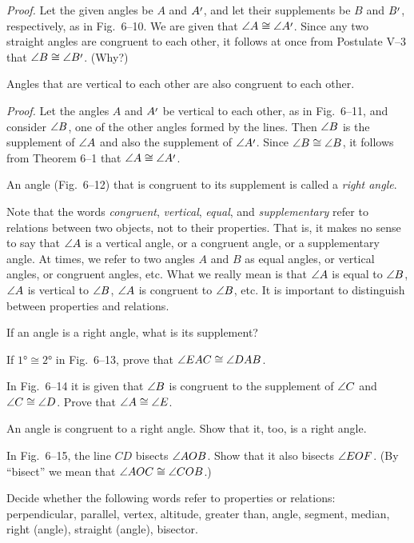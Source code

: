 \documentclass[11pt]{book}
\begin{document}
\emph{Proof.} Let the given angles be $A$ and $A\VIpr$, and let their
supplements be $B$ and $B\VIpr$, respectively, as in Fig.~6--10. We are given
that $\ang{A} \cong \ang{A\VIpr}$. Since any two straight angles are congruent
to each other, it follows at once from Postulate V--3 that $\ang{B} \cong
\ang{B\VIpr}$. (Why?)

\FIGVITENELEVENTWELVE

\begin{theorem}
Angles that are vertical to each other are also congruent to each other.
\end{theorem}

\emph{Proof.} Let the angles $A$ and $A\VIpr$ be vertical to each other, as in
Fig.~6--11, and consider $\angle B$, one of the other angles formed by the
lines. Then $\angle B$ is the supplement of $\angle A$ and also the supplement of
$\ang{A\VIpr}$. Since $\angle B \cong \angle B$, it follows from Theorem 6--1
that $\ang{A} \cong \ang{A\VIpr}$.

\begin{definition}
An angle (Fig.~6--12) that is congruent to its supplement is called a
\emph{right angle}.
\end{definition}

\begin{remark}
Note that the words \emph{congruent}, \emph{vertical}, \emph{equal}, and
\emph{supplementary} refer to relations between two objects, not to their
properties. That is, it makes no sense to say that $\angle A$ is a vertical
angle, or a congruent angle, or a supplementary angle. At times, we refer to
two angles $A$ and $B$ as equal angles, or vertical angles, or congruent
angles, etc. What we really mean is that $\angle A$ is equal to $\angle B$,
$\angle A$ is vertical to $\angle B$, $\angle A$ is congruent to $\angle B$, etc.
It is important to distinguish between properties and relations.
\end{remark}

\begin{exercisecols}
\begin{exlist}
\item If an angle is a right angle, what is its supplement?
\item If $\ang{1} \cong \ang{2}$ in Fig.~6--13, prove that $\angle EAC \cong
  \angle DAB$.
\exfig{\FIGVITHIRTEEN}
\item In Fig.~6--14 it is given that $\angle B$ is congruent to the supplement
  of $\angle C$ and $\angle C \cong \angle D$. Prove that $\angle A \cong \angle E$.
\exfig{\FIGVIFOURTEEN}
\item[\stex 4.] An angle is congruent to a right angle. Show that it, too, is a
  right angle.
\item[5.] In Fig.~6--15, the line $CD$ bisects $\angle AOB$. Show that it also
  bisects $\angle EOF$. (By ``bisect'' we mean that $\angle AOC \cong \angle COB$.)
\exfig{\FIGVIFIFTEEN}
\item[6.] Decide whether the following words refer to properties or relations:
  perpendicular, parallel, vertex, altitude, greater than, angle, segment,
  median, right (angle), straight (angle), bisector.
\end{exlist}
\end{exercisecols}
\end{document}
